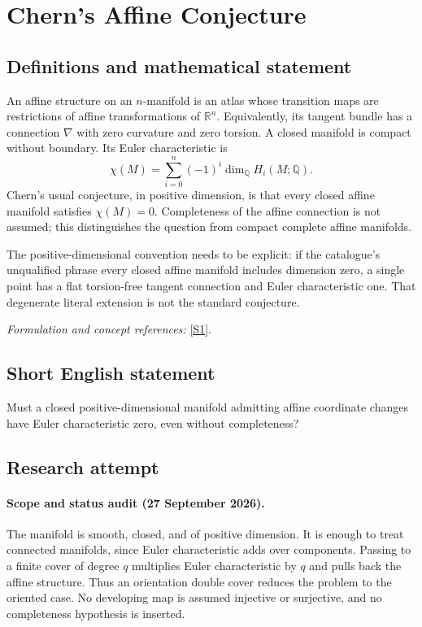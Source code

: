 \documentclass[11pt]{article}
\begin{document}
\section*{\texorpdfstring{Chern's Affine Conjecture}{Chern's Affine Conjecture}}\label{1206}
\subsection{Definitions and mathematical statement}
An affine structure on an $n$-manifold is an atlas whose transition maps are restrictions of affine transformations of ${\mathbb{R}}^n$. Equivalently, its tangent bundle has a connection $\nabla$ with zero curvature and zero torsion. A closed manifold is compact without boundary. Its Euler characteristic is
\[
 \chi(M)=\sum_{i=0}^n(-1)^i\dim_{{\mathbb{Q}}} H_i(M;{\mathbb{Q}}).
\]
Chern's usual conjecture, in positive dimension, is that every closed affine manifold satisfies $\chi(M)=0$. Completeness of the affine connection is not assumed; this distinguishes the question from compact complete affine manifolds.

The positive-dimensional convention needs to be explicit: if the catalogue's unqualified phrase every closed affine manifold includes dimension zero, a single point has a flat torsion-free tangent connection and Euler characteristic one. That degenerate literal extension is not the standard conjecture.
\par\smallskip\textit{Formulation and concept references:} \href{https://link.springer.com/article/10.1007/s41884-026-00193-8}{[S1]}.

\subsection{Short English statement}
Must a closed positive-dimensional manifold admitting affine coordinate changes have Euler characteristic zero, even without completeness?
\subsection{Research attempt}

\paragraph{Scope and status audit (27 September 2026).}
The manifold is smooth, closed, and of positive dimension. It is enough to
treat connected manifolds, since Euler characteristic adds over components.
Passing to a finite cover of degree $q$ multiplies Euler characteristic by
$q$ and pulls back the affine structure. Thus an orientation double cover
reduces the problem to the oriented case. No developing map is assumed
injective or surjective, and no completeness hypothesis is inserted.
\end{document}

